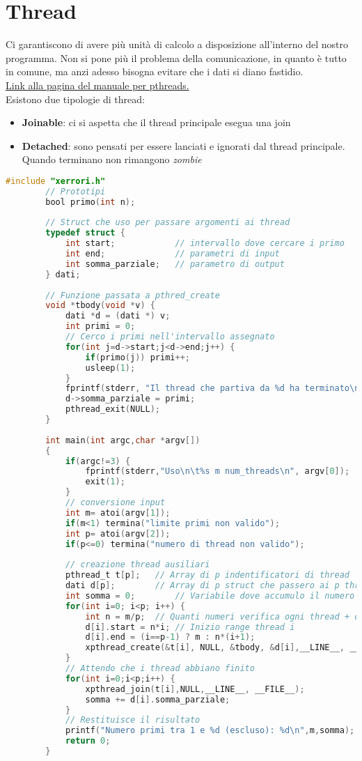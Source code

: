 \section{Thread}
Ci garantiscono di avere più unità di calcolo a disposizione all'interno del nostro programma. Non si pone più il problema della comunicazione, in quanto è tutto in comune, ma anzi adesso bisogna evitare che i dati si diano fastidio.\\
\href{https://man7.org/linux/man-pages/man7/pthreads.7.html}{Link alla pagina del manuale per pthreads.}\\
Esistono due tipologie di thread:
\begin{itemize}
	\item \textbf{Joinable}: ci si aspetta che il thread principale esegua una join
	\item \textbf{Detached}: sono pensati per essere lanciati e ignorati dal thread principale. Quando terminano non rimangono \emph{zombie}
\end{itemize}

\begin{example}
	\label{example:threads_prime}
	\begin{lstlisting}[language=C]
		#include "xerrori.h"
		// Prototipi
		bool primo(int n);
		
		// Struct che uso per passare argomenti ai thread
		typedef struct {
			int start;            // intervallo dove cercare i primo 
			int end;              // parametri di input
			int somma_parziale;   // parametro di output
		} dati;
		
		// Funzione passata a pthred_create
		void *tbody(void *v) {
			dati *d = (dati *) v;
			int primi = 0;
			// Cerco i primi nell'intervallo assegnato
			for(int j=d->start;j<d->end;j++) {
				if(primo(j)) primi++; 
				usleep(1);
			}
			fprintf(stderr, "Il thread che partiva da %d ha terminato\n", d->start);
			d->somma_parziale = primi;
			pthread_exit(NULL);
		}
		
		int main(int argc,char *argv[])
		{
			if(argc!=3) {
				fprintf(stderr,"Uso\n\t%s m num_threads\n", argv[0]);
				exit(1);
			}
			// conversione input
			int m= atoi(argv[1]);
			if(m<1) termina("limite primi non valido");
			int p= atoi(argv[2]);
			if(p<=0) termina("numero di thread non valido");
			
			// creazione thread ausiliari
			pthread_t t[p];   // Array di p indentificatori di thread 
			dati d[p];        // Array di p struct che passero ai p thread
			int somma = 0;        // Variabile dove accumulo il numero di primi
			for(int i=0; i<p; i++) {
				int n = m/p;  // Quanti numeri verifica ogni thread + o - 
				d[i].start = n*i; // Inizio range thread i
				d[i].end = (i==p-1) ? m : n*(i+1);
				xpthread_create(&t[i], NULL, &tbody, &d[i],__LINE__, __FILE__); 
			}
			// Attendo che i thread abbiano finito
			for(int i=0;i<p;i++) {
				xpthread_join(t[i],NULL,__LINE__, __FILE__);
				somma += d[i].somma_parziale;
			}
			// Restituisce il risultato 
			printf("Numero primi tra 1 e %d (escluso): %d\n",m,somma);
			return 0;
		}
	\end{lstlisting}
\end{example}

